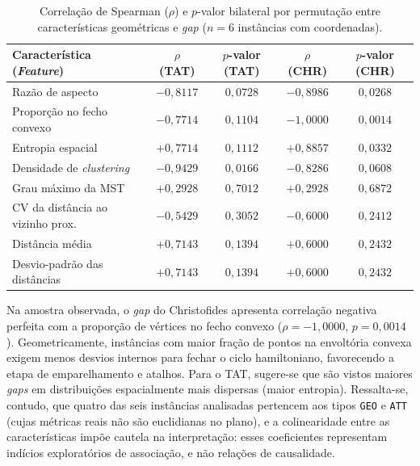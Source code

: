 \documentclass[12pt]{article}
\begin{document}
\begin{table}[ht]
\centering
\caption{Correlação de Spearman ($\rho$) e $p$-valor bilateral por permutação entre características geométricas e \textit{gap} ($n = 6$ instâncias com coordenadas).}
\label{tab:spearman}
\small
\begin{tabular}{lcccc}
\toprule
\textbf{Característica (\textit{Feature})} & \textbf{$\rho$ (TAT)} & \textbf{$p$-valor (TAT)} & \textbf{$\rho$ (CHR)} & \textbf{$p$-valor (CHR)} \\
\midrule
Razão de aspecto                 & $-0{,}8117$ & $0{,}0728$ & $-0{,}8986$ & $0{,}0268$ \\
Proporção no fecho convexo       & $-0{,}7714$ & $0{,}1104$ & $-1{,}0000$ & $0{,}0014$ \\
Entropia espacial                & $+0{,}7714$ & $0{,}1112$ & $+0{,}8857$ & $0{,}0332$ \\
Densidade de \textit{clustering} & $-0{,}9429$ & $0{,}0166$ & $-0{,}8286$ & $0{,}0608$ \\
Grau máximo da MST               & $+0{,}2928$ & $0{,}7012$ & $+0{,}2928$ & $0{,}6872$ \\
CV da distância ao vizinho prox. & $-0{,}5429$ & $0{,}3052$ & $-0{,}6000$ & $0{,}2412$ \\
Distância média                  & $+0{,}7143$ & $0{,}1394$ & $+0{,}6000$ & $0{,}2432$ \\
Desvio-padrão das distâncias     & $+0{,}7143$ & $0{,}1394$ & $+0{,}6000$ & $0{,}2432$ \\
\bottomrule
\end{tabular}
\end{table}

Na amostra observada, o \textit{gap} do Christofides apresenta correlação negativa perfeita com a proporção de vértices no fecho convexo ($\rho = -1{,}0000$, $p = 0{,}0014$). Geometricamente, instâncias com maior fração de pontos na envoltória convexa exigem menos desvios internos para fechar o ciclo hamiltoniano, favorecendo a etapa de emparelhamento e atalhos. Para o TAT, sugere-se que são vistos maiores \textit{gaps} em distribuições espacialmente mais dispersas (maior entropia). Ressalta-se, contudo, que quatro das seis instâncias analisadas pertencem aos tipos \texttt{GEO} e \texttt{ATT} (cujas métricas reais não são euclidianas no plano), e a colinearidade entre as características impõe cautela na interpretação: esses coeficientes representam indícios exploratórios de associação, e não relações de causalidade.
\end{document}
